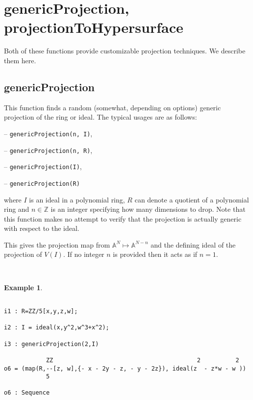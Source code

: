 \documentclass[11pt]{amsart}
\theoremstyle{definition}
\newtheorem{example}{Example}[section]
\begin{document}
\section{genericProjection, projectionToHypersurface}\label{projectionfunctions}

Both of these functions provide customizable projection techniques. We describe them here. 


\subsection{genericProjection} 
This function finds a random (somewhat, depending on options) generic projection of the ring or ideal.
The typical usages are as follows: 
\vspace{1em}

-- {\tt genericProjection(n, I)},

-- {\tt genericProjection(n, R)},


-- {\tt genericProjection(I)},  

-- {\tt genericProjection(R)} 

\vspace{1em}
\noindent where 
$I$ is an ideal 
in a polynomial ring, 
$R$ can denote a quotient of a polynomial ring and 
$n\in \mathbb{Z}$ is
an integer specifying how many dimensions to drop.  Note that this function makes no attempt to verify that the projection is actually generic with respect to the ideal.


This gives the projection map from $\mathbb{A}^N \mapsto\mathbb{A}^{N-n}$ and the defining ideal of the projection of $V(I)$. If no integer $n$ is provided then it acts as if $n = 1$. 

~~

\begin{example}	
~~

{{\small\color{blue}
	\begin{verbatim}

i1 : R=ZZ/5[x,y,z,w];

i2 : I = ideal(x,y^2,w^3+x^2);

i3 : genericProjection(2,I)

            ZZ                                         2          2
o6 = (map(R,--[z, w],{- x - 2y - z, - y - 2z}), ideal(z  - z*w - w ))                   
            5

o6 : Sequence
	\end{verbatim}
	}}
\end{example}
\end{document}
